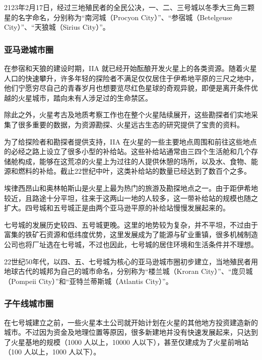 \documentclass[letterpaper,10pt]{sphinxmanual}
\begin{document}
2123年2月17日，经过三地殖民者的全民公决，一、二、三号城以冬季大三角三颗星的名字命名，分别称为“南河城（Procyon City）”、“参宿城（Betelgeuse City）”、“天狼城（Sirius City）”。


\subsubsection{亚马逊城市圈}
\label{cities:id4}\label{cities:index-9}
在参宿和天狼的建设时期，IIA 就已经开始酝酿开发火星上的各类资源。随着火星人口的快速攀升，许多年轻的探险者不满足仅仅居住于伊希地平原的三尺之地中，他们宁愿穷尽自己的青春岁月也想要览尽红色星球的奇观异貌，即便是离开条件优越的火星城市，踏向未有人涉足过的生命禁区。

除此之外，火星考古及地质考察工作也在整个火星陆续展开，这些勘探者们实地采集了很多重要的数据，为资源勘探、火星远古生态的研究提供了宝贵的资料。

为了给探险者和勘探者提供支持，IIA 在火星的一些主要地点周围和前往这些地点的必经之路上设立了很多小型的补给站。这些补给站通常由三四个生活舱和几个存储舱构成，能够在这荒凉的火星上为过往的人提供休憩的场所，以及水、食物、能源和燃料的补给。截止22世纪中叶，这类补给站的数量已经达到了数百个之多。

埃律西昂山和奥林帕斯山是火星上最为热门的旅游及勘探地点之一。由于距伊希地较近，且路途十分平坦，往来于这两山一地的人较多，这一带补给站的规模也随之扩大。四号城和五号城正是由两个亚马逊平原的补给站慢慢发展起来的。

七号城的发展历史较四、五号城更晚。这里的地势较为复杂，并不平坦，不过由于富集的铁矿石资源和低纬度优势，这里发展成为了能源与矿业重镇，很多机械制造公司也将厂址选在七号城，不过也因此，七号城的居住环境和生活条件并不理想。

22世纪50年代，以四、五、七号城为核心的亚马逊城市圈初步建立，当地殖民者用地球古代的城邦为自己的城市命名，分别称为“楼兰城（Kroran City）”、“庞贝城（Pompeii City）”和“亚特兰蒂斯城（Atlantis City）”。


\subsubsection{子午线城市圈}
\label{cities:index-17}\label{cities:id5}
在七号城建立之前，一些火星本土公司就开始计划在火星的其他地方投资建造新的城市。不过因为资金及地理位置等原因，很多新建地并没有快速发展起来，只达到了火星基地的规模（1000 人以上，10000 人以下），甚至仅建成为了火星前哨站（100 人以上，1000 人以下）。
\end{document}
